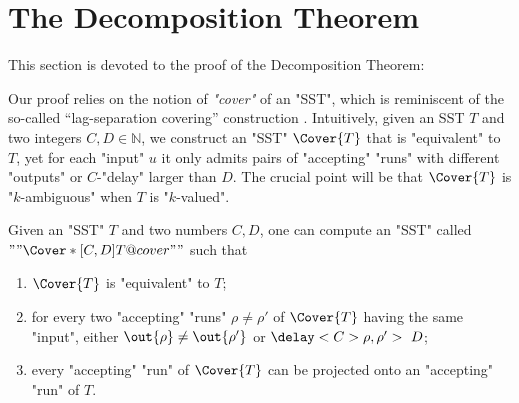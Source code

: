 \documentclass{theoretics}
\newcommand{\RestateGo}[1]{\renewcommand{#1}{(Restated)}}
\begin{document}
\section{The Decomposition Theorem}\label{sec:decomposition}


This section is devoted to the proof of the Decomposition Theorem:
\RestateGo{\restateDecomposition}
\Decomposition*

 
Our proof relies on the notion of 
\emph{"cover"} of an "SST", which is
reminiscent of the so-called ``lag-separation covering''
construction \cite{deSouza-thesis,SakarovitchDeSouzaMFCS08}.
Intuitively, given an SST $T$ and 
two integers $C,D \in \mathbb{N}$,
we construct an "SST" $\Cover{T}$
that is "equivalent" to $T$,
yet for each "input" $u$ it only admits 
pairs of "accepting" "runs" with 
different "outputs" or $C$-"delay" larger than $D$. 
The crucial point will be that $\Cover{T}$ is "$k$-ambiguous" when $T$ is "$k$-valued". 



\begin{proposition}\label{prop:separation-covering}
Given an "SST" $T$ and two numbers $C,D$, 
one can compute an "SST" called
$""\Cover*[C,D]{T}@cover""$ such that
\begin{enumerate}
\item $\Cover{T}$ is "equivalent" to $T$;
\item for every two "accepting" "runs" $\rho\neq\rho'$ of $\Cover{T}$ 
      having the same "input", 
      either $\out{\rho} \neq \out{\rho'}$ or $\delay<C>{\rho,\rho'} >~D$;
\item every "accepting" "run" of $\Cover{T}$ can be projected onto an "accepting" "run" of $T$.
\end{enumerate}
\end{proposition}
\end{document}
